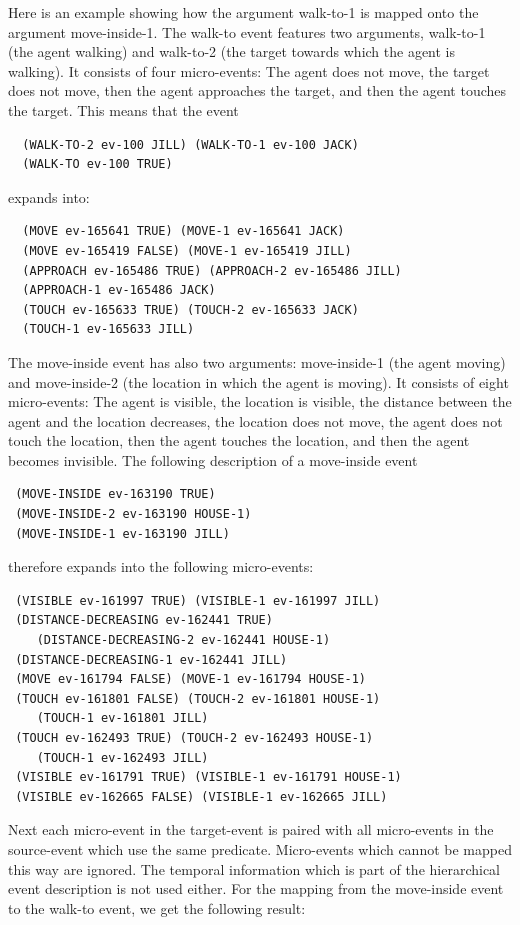 Here is an example showing how the argument walk-to-1 is mapped onto the argument move-inside-1.
The walk-to event features two arguments, walk-to-1 (the agent walking) and walk-to-2 (the 
target towards which the agent is walking). It consists of four micro-events: The agent does not 
move, the target does not move, then the agent approaches the target, and then the agent touches the target. 
This means that the event 
\begin{verbatim}
  (WALK-TO-2 ev-100 JILL) (WALK-TO-1 ev-100 JACK) 
  (WALK-TO ev-100 TRUE)
\end{verbatim}
expands into:
\begin{verbatim}
  (MOVE ev-165641 TRUE) (MOVE-1 ev-165641 JACK)
  (MOVE ev-165419 FALSE) (MOVE-1 ev-165419 JILL)
  (APPROACH ev-165486 TRUE) (APPROACH-2 ev-165486 JILL)
  (APPROACH-1 ev-165486 JACK)
  (TOUCH ev-165633 TRUE) (TOUCH-2 ev-165633 JACK)
  (TOUCH-1 ev-165633 JILL)
\end{verbatim}
The move-inside event has also two arguments: move-inside-1 (the agent moving) and 
move-inside-2 (the location in which the agent is moving). It consists of eight 
micro-events: The agent is visible, the location is visible, the distance between the agent and 
the location decreases, the location does not move, the agent does not touch the location, 
then the agent touches the location, and then the agent becomes invisible. The 
following description of a move-inside event
\begin{verbatim}
 (MOVE-INSIDE ev-163190 TRUE)
 (MOVE-INSIDE-2 ev-163190 HOUSE-1)
 (MOVE-INSIDE-1 ev-163190 JILL)
\end{verbatim}
therefore expands into the following micro-events:
\begin{verbatim}
 (VISIBLE ev-161997 TRUE) (VISIBLE-1 ev-161997 JILL)
 (DISTANCE-DECREASING ev-162441 TRUE) 
    (DISTANCE-DECREASING-2 ev-162441 HOUSE-1) 
 (DISTANCE-DECREASING-1 ev-162441 JILL)
 (MOVE ev-161794 FALSE) (MOVE-1 ev-161794 HOUSE-1)
 (TOUCH ev-161801 FALSE) (TOUCH-2 ev-161801 HOUSE-1) 
    (TOUCH-1 ev-161801 JILL) 
 (TOUCH ev-162493 TRUE) (TOUCH-2 ev-162493 HOUSE-1) 
    (TOUCH-1 ev-162493 JILL)
 (VISIBLE ev-161791 TRUE) (VISIBLE-1 ev-161791 HOUSE-1) 
 (VISIBLE ev-162665 FALSE) (VISIBLE-1 ev-162665 JILL)
\end{verbatim}
Next each micro-event in the target-event is paired with all micro-events in the source-event which use the same predicate. Micro-events which cannot be mapped this way are ignored. The temporal information which is part of the hierarchical event description is not used either. For the mapping from the move-inside event to the walk-to event, we get the following result:
